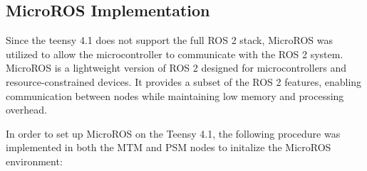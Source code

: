 \subsection{MicroROS Implementation}

Since the teensy 4.1 does not support the full ROS 2 stack, MicroROS was utilized to allow the microcontroller to communicate with the ROS 2 system. MicroROS is a lightweight version of ROS 2 designed for microcontrollers and resource-constrained devices. It provides a subset of the ROS 2 features, enabling communication between nodes while maintaining low memory and processing overhead. 

In order to set up MicroROS on the Teensy 4.1, the following procedure was implemented in both the MTM and PSM nodes to initalize the MicroROS environment:

